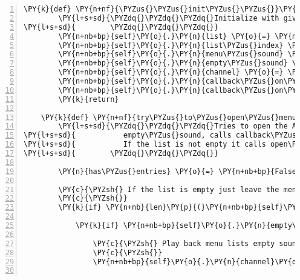 \begin{Verbatim}[commandchars=\\\{\},numbers=left,firstnumber=1,stepnumber=1]
    \PY{k}{def} \PY{n+nf}{\PYZus{}\PYZus{}init\PYZus{}\PYZus{}}\PY{p}{(}\PY{n+nb+bp}{self}\PY{p}{,} \PY{n+nb}{list}\PY{p}{,} \PY{n}{menu\PYZus{}sound}\PY{p}{,} \PY{n}{empty\PYZus{}sound}\PY{p}{,} \PY{n}{channel}\PY{p}{,} \PY{n}{callback\PYZus{}on\PYZus{}entry\PYZus{}selected}\PY{p}{,} \PY{n}{callback\PYZus{}on\PYZus{}exit}\PY{p}{)}\PY{p}{:}
        \PY{l+s+sd}{\PYZdq{}\PYZdq{}\PYZdq{}Initialize with given parameters and the list\PYZus{}index set to None.}
\PY{l+s+sd}{        \PYZdq{}\PYZdq{}\PYZdq{}}
        \PY{n+nb+bp}{self}\PY{o}{.}\PY{n}{list} \PY{o}{=} \PY{n+nb}{list}
        \PY{n+nb+bp}{self}\PY{o}{.}\PY{n}{list\PYZus{}index} \PY{o}{=} \PY{n+nb+bp}{None}
        \PY{n+nb+bp}{self}\PY{o}{.}\PY{n}{menu\PYZus{}sound} \PY{o}{=} \PY{n}{menu\PYZus{}sound}
        \PY{n+nb+bp}{self}\PY{o}{.}\PY{n}{empty\PYZus{}sound} \PY{o}{=} \PY{n}{empty\PYZus{}sound}
        \PY{n+nb+bp}{self}\PY{o}{.}\PY{n}{channel} \PY{o}{=} \PY{n}{channel}
        \PY{n+nb+bp}{self}\PY{o}{.}\PY{n}{callback\PYZus{}on\PYZus{}entry\PYZus{}selected} \PY{o}{=} \PY{n}{callback\PYZus{}on\PYZus{}entry\PYZus{}selected}
        \PY{n+nb+bp}{self}\PY{o}{.}\PY{n}{callback\PYZus{}on\PYZus{}exit} \PY{o}{=} \PY{n}{callback\PYZus{}on\PYZus{}exit}
        \PY{k}{return}

    \PY{k}{def} \PY{n+nf}{try\PYZus{}to\PYZus{}open\PYZus{}menu\PYZus{}list}\PY{p}{(}\PY{n+nb+bp}{self}\PY{p}{)}\PY{p}{:}
        \PY{l+s+sd}{\PYZdq{}\PYZdq{}\PYZdq{}Tries to open the AudioMenuList. If the list is empty it plays the}
\PY{l+s+sd}{           empty\PYZus{}sound, calls callback\PYZus{}on\PYZus{}exit and returns False.}
\PY{l+s+sd}{           If the list is not empty it calls open\PYZus{}menu\PYZus{}list and returns True.}
\PY{l+s+sd}{        \PYZdq{}\PYZdq{}\PYZdq{}}

        \PY{n}{has\PYZus{}entries} \PY{o}{=} \PY{n+nb+bp}{False}

        \PY{c}{\PYZsh{} If the list is empty just leave the menu and play the empty sound}
        \PY{c}{\PYZsh{}}
        \PY{k}{if} \PY{n+nb}{len}\PY{p}{(}\PY{n+nb+bp}{self}\PY{o}{.}\PY{n}{list}\PY{p}{)} \PY{o}{\PYZlt{}}\PY{o}{=} \PY{l+m+mi}{0}\PY{p}{:}

            \PY{k}{if} \PY{n+nb+bp}{self}\PY{o}{.}\PY{n}{empty\PYZus{}sound} \PY{o+ow}{is} \PY{o+ow}{not} \PY{n+nb+bp}{None}\PY{p}{:}

                \PY{c}{\PYZsh{} Play back menu lists empty sound}
                \PY{c}{\PYZsh{}}
                \PY{n+nb+bp}{self}\PY{o}{.}\PY{n}{channel}\PY{o}{.}\PY{n}{play}\PY{p}{(}\PY{n+nb+bp}{self}\PY{o}{.}\PY{n}{empty\PYZus{}sound}\PY{p}{)}


\end{Verbatim}
